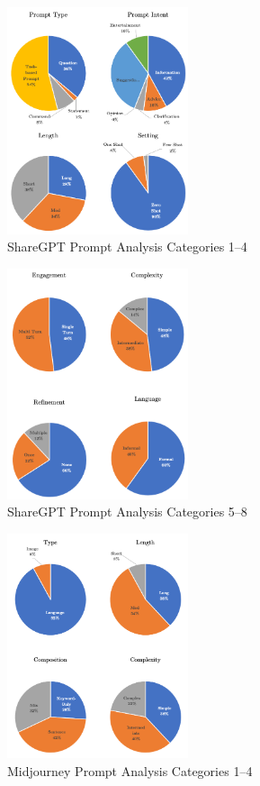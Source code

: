 \begin{figure}
    \centering
    \includegraphics[width=0.475\textwidth]{images/charts1}
    \caption{ShareGPT Prompt Analysis Categories 1--4}
    \label{fig:chatgpt-categories-1}
\end{figure}
\begin{figure}
    \centering
    \includegraphics[width=0.475\textwidth]{images/charts2}
    \caption{ShareGPT Prompt Analysis Categories 5--8}
    \label{fig:chatgpt-categories-2}
\end{figure}
\begin{figure}
    \centering
    \includegraphics[width=0.475\textwidth]{images/charts3}
    \caption{Midjourney Prompt Analysis Categories 1--4}
    \label{fig:midjourney-categories-1}
\end{figure}
